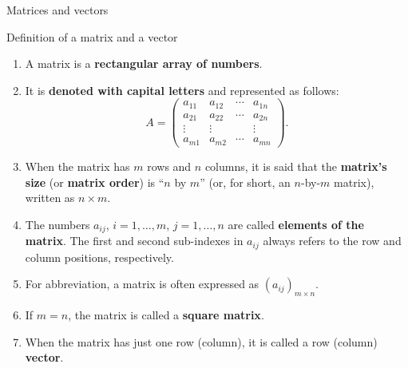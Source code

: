 \documentclass[9pt]{beamer}
\begin{document}
\begin{frame}{Matrices and vectors}

    \begin{block}{Definition of a matrix and a vector}

    \begin{enumerate}[leftmargin = 0.8cm, label = $\bullet$, rightmargin = 0.4cm]
        \item A matrix is a \textbf{rectangular array of numbers}. 
        
        \item It is \textbf{denoted with capital letters} and represented as follows:
        $$
        A = 
        \begin{pmatrix}
        a_{11} & a_{12} & \cdots & a_{1n} \\
        a_{21} & a_{22} & \cdots & a_{2n} \\
        \vdots & \vdots &        & \vdots \\
        a_{m1} & a_{m2} & \cdots & a_{mn}
        \end{pmatrix}.
        $$
        \item When the matrix has $m$ rows and $n$ columns, it is said that the \textbf{matrix's size} (or \textbf{matrix order}) is ``$n$ by $m$'' (or, for short, an $n$-by-$m$ matrix), written as $n\times m$.

        \item The numbers $a_{ij}$, $i = 1,\dots,m$, $j=1,\dots,n$ are called \textbf{elements of the matrix}. The first and second sub-indexes in $a_{ij}$ always refers to the row and column positions, respectively.

        \item For abbreviation, a matrix is often expressed as $(a_{ij})_{m\times n}$.

        \item If $m = n$, the matrix is called a \textbf{square matrix}.

        \item When the matrix has just one row (column), it is called a row (column) \textbf{vector}.
    \end{enumerate}
    
    \end{block}

\end{frame}
\end{document}
